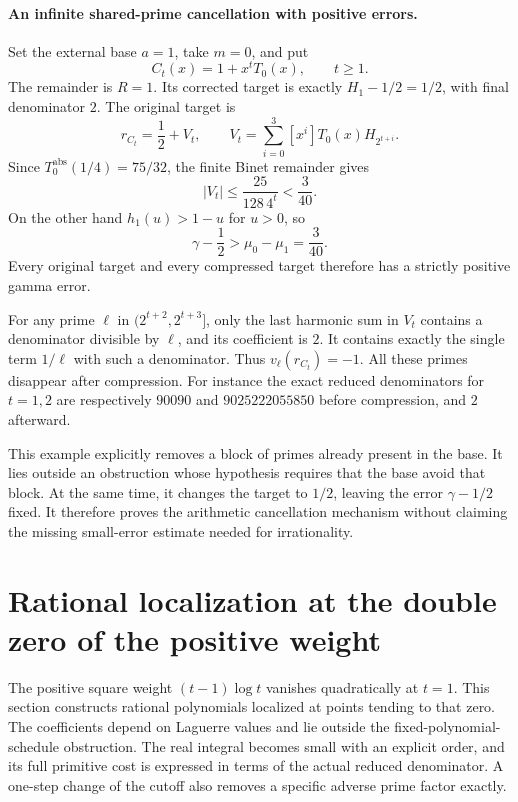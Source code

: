 \documentclass[11pt,a4paper]{article}
\theoremstyle{definition}
\theoremstyle{remark}
\begin{document}
\paragraph{An infinite shared-prime cancellation with positive errors.}
Set the external base $a=1$, take $m=0$, and put
\[
 C_t(x)=1+x^tT_0(x),\qquad t\ge1.
\]
The remainder is $R=1$. Its corrected target is exactly
$H_1-1/2=1/2$, with final denominator $2$. The original target is
\[
 r_{C_t}=\frac12+V_t,\qquad
 V_t=\sum_{i=0}^3[x^i]T_0(x)H_{2^{t+i}}.
\]
Since $T_0^{\mathrm{abs}}(1/4)=75/32$, the finite Binet remainder gives
\[
 |V_t|\le\frac{25}{128\,4^t}<\frac3{40}.
\]
On the other hand $h_1(u)>1-u$ for $u>0$, so
\[
 \gamma-\frac12>\mu_0-\mu_1=\frac3{40}.
\]
Every original target and every compressed target therefore has a
strictly positive gamma error.

For any prime $\ell$ in $(2^{t+2},2^{t+3}]$, only the last harmonic sum
in $V_t$ contains a denominator divisible by $\ell$, and its coefficient
is $2$. It contains exactly the single term $1/\ell$ with such a
denominator. Thus $v_\ell(r_{C_t})=-1$. All these primes disappear after
compression. For instance the exact reduced denominators for $t=1,2$
are respectively $90090$ and $9025222055850$ before compression, and
$2$ afterward.

This example explicitly removes a block of primes already present in
the base. It lies outside an obstruction whose hypothesis requires that
the base avoid that block. At the same time, it changes the target to
$1/2$, leaving the error $\gamma-1/2$ fixed. It therefore proves the
arithmetic cancellation mechanism without claiming the missing
small-error estimate needed for irrationality.


\section{Rational localization at the double zero of the positive weight}
\label{stage3-localization-section}

The positive square weight $(t-1)\log t$ vanishes quadratically at $t=1$.
This section constructs rational polynomials localized at points tending
to that zero. The coefficients depend on Laguerre values and lie outside
the fixed-polynomial-schedule obstruction. The real integral becomes
small with an explicit order, and its full primitive cost is expressed
in terms of the actual reduced denominator. A one-step change of the
cutoff also removes a specific adverse prime factor exactly.
\end{document}
